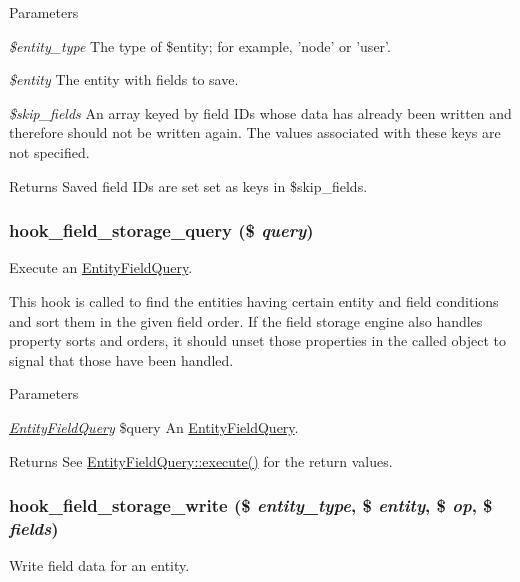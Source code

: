 \begin{DoxyParams}{Parameters}
\item[{\em \$entity\_\-type}]The type of \$entity; for example, 'node' or 'user'. \item[{\em \$entity}]The entity with fields to save. \item[{\em \$skip\_\-fields}]An array keyed by field IDs whose data has already been written and therefore should not be written again. The values associated with these keys are not specified. \end{DoxyParams}
\begin{DoxyReturn}{Returns}
Saved field IDs are set set as keys in \$skip\_\-fields. 
\end{DoxyReturn}
\hypertarget{group__field__storage_gaf46795ee1b678a72b4457b524303c794}{
\subsubsection[{hook\_\-field\_\-storage\_\-query}]{\setlength{\rightskip}{0pt plus 5cm}hook\_\-field\_\-storage\_\-query (\$ {\em query})}}
\label{group__field__storage_gaf46795ee1b678a72b4457b524303c794}
Execute an \hyperlink{classEntityFieldQuery}{EntityFieldQuery}.

This hook is called to find the entities having certain entity and field conditions and sort them in the given field order. If the field storage engine also handles property sorts and orders, it should unset those properties in the called object to signal that those have been handled.


\begin{DoxyParams}{Parameters}
\item[{\em \hyperlink{classEntityFieldQuery}{EntityFieldQuery}}]\$query An \hyperlink{classEntityFieldQuery}{EntityFieldQuery}.\end{DoxyParams}
\begin{DoxyReturn}{Returns}
See \hyperlink{classEntityFieldQuery_ac90614418d7fb3a0c81134889fe1bcbd}{EntityFieldQuery::execute()} for the return values. 
\end{DoxyReturn}
\hypertarget{group__field__storage_ga5663ebcfb92828cbed84a041e9a4b0d1}{
\subsubsection[{hook\_\-field\_\-storage\_\-write}]{\setlength{\rightskip}{0pt plus 5cm}hook\_\-field\_\-storage\_\-write (\$ {\em entity\_\-type}, \/  \$ {\em entity}, \/  \$ {\em op}, \/  \$ {\em fields})}}
\label{group__field__storage_ga5663ebcfb92828cbed84a041e9a4b0d1}
Write field data for an entity.

